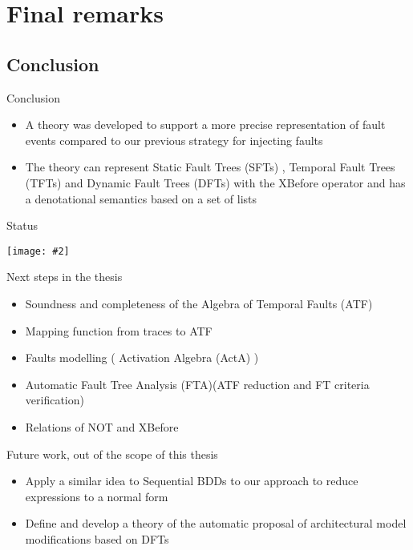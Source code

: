 \documentclass{beamer}
\def\FTA{Fault Tree Analysis (FTA)\gdef\FTA{FTA\xspace}\xspace}
\def\SFT{%
	Static Fault Tree (SFT)%
	\gdef\SFT{SFT\xspace}%
	\gdef\SFTs{SFTs\xspace}%
	\xspace%
}
\def\SFTs{%
	Static Fault Trees (SFTs)%
	\gdef\SFT{SFT\xspace}%
	\gdef\SFTs{SFTs\xspace}%
	\xspace%
}
\def\TFT{%
	Temporal Fault Tree (TFT)%
	\gdef\TFT{TFT\xspace}%
	\gdef\TFTs{TFTs\xspace}%
	\xspace%
}
\def\TFTs{%
	Temporal Fault Trees (TFTs)%
	\gdef\TFT{TFT\xspace}%
	\gdef\TFTs{TFTs\xspace}%
	\xspace%
}
\def\DFT{%
	Dynamic Fault Tree (DFT)%
	\gdef\DFT{DFT\xspace}%
	\gdef\DFTs{DFTs\xspace}%
	\xspace%
}
\def\DFTs{%
	Dynamic Fault Trees (DFTs)%
	\gdef\DFT{DFT\xspace}%
	\gdef\DFTs{DFTs\xspace}%
	\xspace%
}
\def\ATF{%
	Algebra of Temporal Faults (ATF)%
	\gdef\ATF{ATF\xspace}%
	\gdef\iATF{an ATF\xspace}%
	\gdef\IATF{An ATF\xspace}%
	\xspace%
}
\def\iATF{%
	an Algebra of Temporal Faults (ATF)%
	\gdef\ATF{ATF\xspace}%
	\gdef\iATF{an ATF\xspace}%
	\gdef\IATF{An ATF\xspace}%
	\xspace%
}
\def\IATF{%
	An Algebra of Temporal Faults (ATF)%
	\gdef\ATF{ATF\xspace}%
	\gdef\iATF{an ATF\xspace}%
	\gdef\IATF{An ATF\xspace}%
	\xspace%
}
\def\activation{%
	Activation Algebra (ActA)%
	\gdef\activation{ActA\xspace}%
	\xspace%
}
\newcommand{\includegraphicsaspectratio}[2][1]{%
  \texttt{[image: \#2]}%
}
\begin{document}
\section{Final remarks}
\subsection{Conclusion}

\begin{frame}{Conclusion}
	\begin{itemize}
		\item A theory was developed to support a more precise representation of fault events compared to our previous strategy for injecting faults
		\item The theory can represent \SFTs, \TFTs and \DFTs with the XBefore operator and has a denotational semantics based on a set of lists
	\end{itemize}
\end{frame}

\begin{frame}{Status}
	\begin{center}
		\includegraphicsaspectratio[0.8]{StrategyOverview-Status}
	\end{center}
\end{frame}

\begin{frame}[label=nextsteps]{Next steps in the thesis}
	\begin{itemize}
		\item Soundness and completeness of the \ATF
		\item Mapping function from traces to \ATF
		\item Faults modelling (\activation) 
		\item Automatic \FTA (\ATF reduction and FT criteria verification)
		\item Relations of NOT and XBefore
	\end{itemize}
	\hyperlink{tasks}{}
\end{frame}

\begin{frame}{Future work, out of the scope of this thesis}
	\begin{itemize}
		\item Apply a similar idea to Sequential BDDs to our approach to reduce expressions to a normal form
		\item Define and develop a theory of the automatic proposal of architectural model modifications based on \DFTs
	\end{itemize}
\end{frame}
\end{document}
